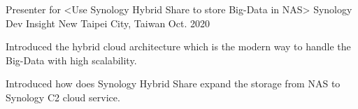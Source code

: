 

\begin{cventries}

  \cventry
    {Presenter for <Use Synology Hybrid Share to store Big-Data in NAS>} %
    {Synology Dev Insight} %
    {New Taipei City, Taiwan} %
    {Oct. 2020} %
    {
      \begin{cvitems} %
        \item {Introduced the hybrid cloud architecture which is the modern way to handle the Big-Data with high scalability.}
        \item {Introduced how does Synology Hybrid Share expand the storage from NAS to Synology C2 cloud service.}
      \end{cvitems}
    }
\end{cventries}
